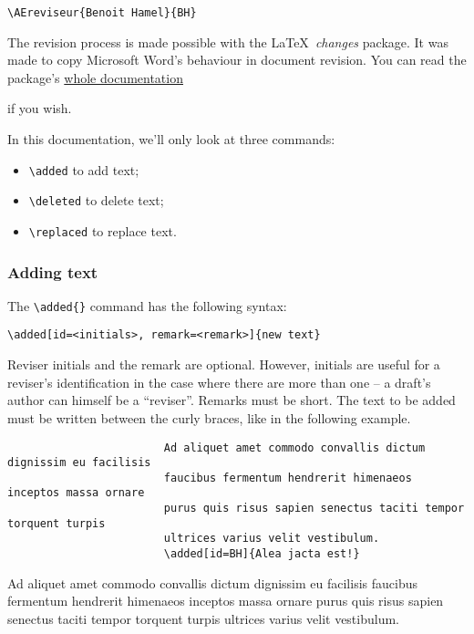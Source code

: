 \documentclass[english]{article}
\newcommand{\cmd}[1]{%
	\texttt{\textbackslash#1\{\}}
}
\newcommand{\dec}[1]{%
	\texttt{\textbackslash#1}
}
\newcommand{\lien}[2]{%
	\href{#1}{#2 \faIcon{external-link-alt}}
}
\begin{document}
			\begin{shaded*}
				\verb|\AEreviseur{Benoit Hamel}{BH}|
			\end{shaded*}
		
			The revision process is made possible with the \LaTeX\ \emph{changes} package. It was made to
			copy Microsoft Word's behaviour in document revision. You can read the package's
			\lien{http://mirrors.ctan.org/macros/latex/contrib/changes/changes.english.pdf}{whole documentation}
			if you wish.
			
			In this documentation, we'll only look at three commands:
			
			\begin{itemize}
				\item \dec{added} to add text;
				\item \dec{deleted} to delete text;
				\item \dec{replaced} to replace text.
			\end{itemize}
		
			\subsubsection{Adding text}
			
				The \cmd{added} command has the following syntax:
				
				\begin{shaded*}
					\verb|\added[id=<initials>, remark=<remark>]{new text}|
				\end{shaded*}
			
				Reviser initials and the remark are optional. However, initials are useful for a reviser's
				identification in the case where there are more than one -- a draft's author can himself
				be a ``reviser''. Remarks must be short. The text to be added must be written between the
				curly braces, like in the following example.
				
				\begin{shaded*}
					\begin{verbatim}
						Ad aliquet amet commodo convallis dictum dignissim eu facilisis 
						faucibus fermentum hendrerit himenaeos inceptos massa ornare 
						purus quis risus sapien senectus taciti tempor torquent turpis 
						ultrices varius velit vestibulum.
						\added[id=BH]{Alea jacta est!}
					\end{verbatim}
				\end{shaded*}
			
				\begin{leftbar}
					Ad aliquet amet commodo convallis dictum dignissim eu facilisis 
					faucibus fermentum hendrerit himenaeos inceptos massa ornare 
					purus quis risus sapien senectus taciti tempor torquent turpis 
					ultrices varius velit vestibulum.
				\end{leftbar}
			
\end{document}
